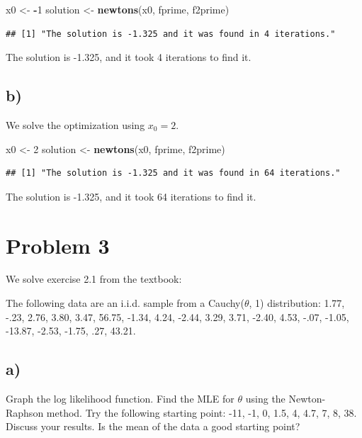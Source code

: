 \documentclass[]{article}
\newenvironment{Shaded}{\begin{snugshade}}{\end{snugshade}}
\newcommand{\KeywordTok}[1]{\textcolor[rgb]{0.13,0.29,0.53}{\textbf{#1}}}
\newcommand{\DecValTok}[1]{\textcolor[rgb]{0.00,0.00,0.81}{#1}}
\newcommand{\StringTok}[1]{\textcolor[rgb]{0.31,0.60,0.02}{#1}}
\newcommand{\OperatorTok}[1]{\textcolor[rgb]{0.81,0.36,0.00}{\textbf{#1}}}
\newcommand{\NormalTok}[1]{#1}
\begin{document}
\begin{Shaded}
\begin{Highlighting}[]
\NormalTok{x0 <-}\StringTok{ }\OperatorTok{-}\DecValTok{1}
\NormalTok{solution <-}\StringTok{ }\KeywordTok{newtons}\NormalTok{(x0, fprime, f2prime)}
\end{Highlighting}
\end{Shaded}

\begin{verbatim}
## [1] "The solution is -1.325 and it was found in 4 iterations."
\end{verbatim}

The solution is -1.325, and it took 4 iterations to find it.

\subsection{b)}\label{b-1}

We solve the optimization using \(x_0=2\).

\begin{Shaded}
\begin{Highlighting}[]
\NormalTok{x0 <-}\StringTok{ }\DecValTok{2}
\NormalTok{solution <-}\StringTok{ }\KeywordTok{newtons}\NormalTok{(x0, fprime, f2prime)}
\end{Highlighting}
\end{Shaded}

\begin{verbatim}
## [1] "The solution is -1.325 and it was found in 64 iterations."
\end{verbatim}

The solution is -1.325, and it took 64 iterations to find it.

\section{Problem 3}\label{problem-3}

We solve exercise 2.1 from the textbook:

The following data are an i.i.d. sample from a Cauchy(\(\theta\), 1)
distribution: 1.77, -.23, 2.76, 3.80, 3.47, 56.75, -1.34, 4.24, -2.44,
3.29, 3.71, -2.40, 4.53, -.07, -1.05, -13.87, -2.53, -1.75, .27, 43.21.

\subsection{a)}\label{a-2}

Graph the log likelihood function. Find the MLE for \(\theta\) using the
Newton-Raphson method. Try the following starting point: -11, -1, 0,
1.5, 4, 4.7, 7, 8, 38. Discuss your results. Is the mean of the data a
good starting point?
\end{document}
